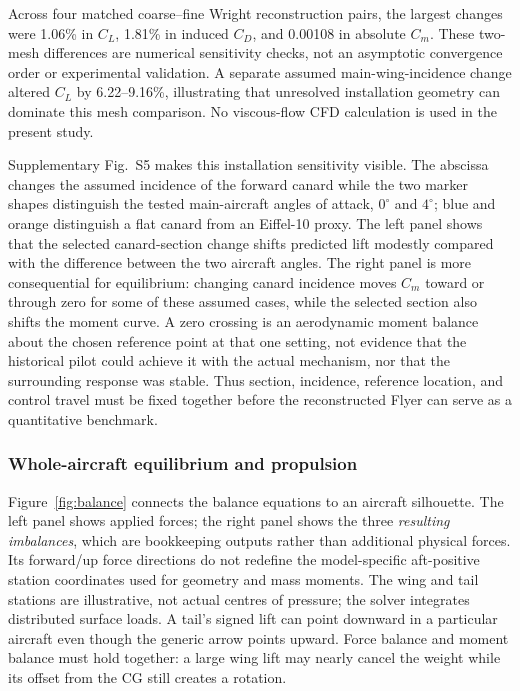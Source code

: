 \documentclass[10pt,letterpaper]{article}
\begin{document}
Across four matched coarse--fine Wright reconstruction pairs, the largest changes were 1.06\% in $C_L$, 1.81\% in induced $C_D$, and 0.00108 in absolute $C_m$. These two-mesh differences are numerical sensitivity checks, not an asymptotic convergence order or experimental validation. A separate assumed main-wing-incidence change altered $C_L$ by 6.22--9.16\%, illustrating that unresolved installation geometry can dominate this mesh comparison. No viscous-flow CFD calculation is used in the present study.

Supplementary Fig.~S5 makes this installation sensitivity visible. The abscissa changes the assumed incidence of the forward canard while the two marker shapes distinguish the tested main-aircraft angles of attack, $0^\circ$ and $4^\circ$; blue and orange distinguish a flat canard from an Eiffel-10 proxy. The left panel shows that the selected canard-section change shifts predicted lift modestly compared with the difference between the two aircraft angles. The right panel is more consequential for equilibrium: changing canard incidence moves $C_m$ toward or through zero for some of these assumed cases, while the selected section also shifts the moment curve. A zero crossing is an aerodynamic moment balance about the chosen reference point at that one setting, not evidence that the historical pilot could achieve it with the actual mechanism, nor that the surrounding response was stable. Thus section, incidence, reference location, and control travel must be fixed together before the reconstructed Flyer can serve as a quantitative benchmark.



\subsubsection{Whole-aircraft equilibrium and propulsion}
Figure~\ref{fig:balance} connects the balance equations to an aircraft silhouette. The left panel shows applied forces; the right panel shows the three \emph{resulting imbalances}, which are bookkeeping outputs rather than additional physical forces. Its forward/up force directions do not redefine the model-specific aft-positive station coordinates used for geometry and mass moments. The wing and tail stations are illustrative, not actual centres of pressure; the solver integrates distributed surface loads. A tail's signed lift can point downward in a particular aircraft even though the generic arrow points upward. Force balance and moment balance must hold together: a large wing lift may nearly cancel the weight while its offset from the CG still creates a rotation.
\end{document}
